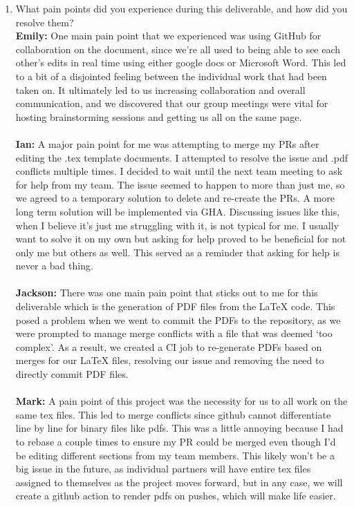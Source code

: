 \documentclass{article}
\begin{document}
\begin{enumerate}
    \item What pain points did you experience during this deliverable, and how
    did you resolve them?\\
    \textbf{Emily:} One main pain point that we experienced was using GitHub for collaboration on the document, since we’re all used to being able to see each 
                    other’s edits in real time using either google docs or Microsoft Word. This led to a bit of a disjointed feeling between the individual work 
                    that had been taken on. It ultimately led to us increasing collaboration and overall communication, and we discovered that our group meetings 
                    were vital for hosting brainstorming sessions and getting us all on the same page. \\ \\
    \textbf{Ian:} A major pain point for me was attempting to merge my PRs after editing the .tex template documents. I attempted to resolve the issue and .pdf conflicts multiple times. 
                  I decided to wait until the next team meeting to ask for help from my team. The issue seemed to happen to more than just me, so we agreed to a temporary solution to delete and re-create 
                  the PRs. A more long term solution will be implemented via GHA. Discussing issues like this, when I believe it’s just me struggling with it, is not typical for me. I usually want to solve 
                  it on my own but asking for help proved to be beneficial for not only me but others as well. This served as a reminder that asking for help is never a bad thing.\\ \\
    \textbf{Jackson:} There was one main pain point that sticks out to me for this deliverable which is the generation of PDF files from the LaTeX code. This posed 
                    a problem when we went to commit the PDFs to the repository, as we were prompted to manage merge conflicts with a file that was deemed ‘too complex’. As a result, 
                    we created a CI job to re-generate PDFs based on merges for our LaTeX files, resolving our issue and removing the need to directly commit PDF files.\\ \\
    \textbf{Mark:} A pain point of this project was the necessity for us to all work on the same tex files. This led to merge conflicts since github cannot differentiate line by line for binary files like pdfs. 
                   This was a little annoying because I had to rebase a couple times to ensure my PR could be merged even though I’d be editing different sections from my team members. 
                   This likely won’t be a big issue in the future, as individual partners will have entire tex files assigned to themselves as the project moves forward, but in any case, 
                   we will create a github action to render pdfs on pushes, which will make life easier.\\ \\


\end{enumerate}
\end{document}

